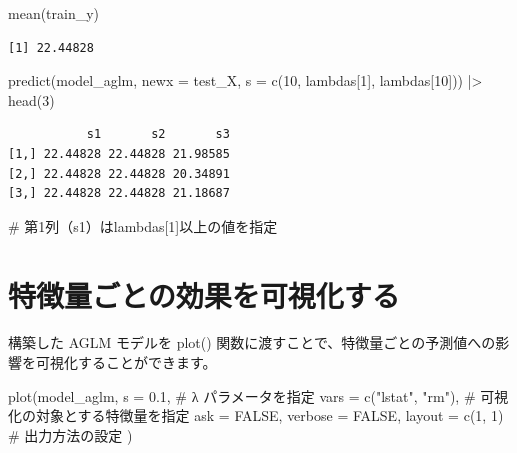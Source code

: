 \documentclass[
  letterpaper,
  DIV=11,
  numbers=noendperiod]{scrreprt}
\newenvironment{Shaded}{\begin{snugshade}}{\end{snugshade}}
\newcommand{\AttributeTok}[1]{\textcolor[rgb]{0.40,0.45,0.13}{#1}}
\newcommand{\CommentTok}[1]{\textcolor[rgb]{0.37,0.37,0.37}{#1}}
\newcommand{\ConstantTok}[1]{\textcolor[rgb]{0.56,0.35,0.01}{#1}}
\newcommand{\DecValTok}[1]{\textcolor[rgb]{0.68,0.00,0.00}{#1}}
\newcommand{\FloatTok}[1]{\textcolor[rgb]{0.68,0.00,0.00}{#1}}
\newcommand{\FunctionTok}[1]{\textcolor[rgb]{0.28,0.35,0.67}{#1}}
\newcommand{\NormalTok}[1]{\textcolor[rgb]{0.00,0.23,0.31}{#1}}
\newcommand{\SpecialCharTok}[1]{\textcolor[rgb]{0.37,0.37,0.37}{#1}}
\newcommand{\StringTok}[1]{\textcolor[rgb]{0.13,0.47,0.30}{#1}}
\begin{document}
\begin{Shaded}
\begin{Highlighting}[]
\FunctionTok{mean}\NormalTok{(train\_y)}
\end{Highlighting}
\end{Shaded}

\begin{verbatim}
[1] 22.44828
\end{verbatim}

\begin{Shaded}
\begin{Highlighting}[]
\FunctionTok{predict}\NormalTok{(model\_aglm, }\AttributeTok{newx =}\NormalTok{ test\_X,}
        \AttributeTok{s =} \FunctionTok{c}\NormalTok{(}\DecValTok{10}\NormalTok{, lambdas[}\DecValTok{1}\NormalTok{], lambdas[}\DecValTok{10}\NormalTok{])) }\SpecialCharTok{|\textgreater{}} \FunctionTok{head}\NormalTok{(}\DecValTok{3}\NormalTok{)}
\end{Highlighting}
\end{Shaded}

\begin{verbatim}
           s1       s2       s3
[1,] 22.44828 22.44828 21.98585
[2,] 22.44828 22.44828 20.34891
[3,] 22.44828 22.44828 21.18687
\end{verbatim}

\begin{Shaded}
\begin{Highlighting}[]
\CommentTok{\# 第1列（s1）はlambdas[1]以上の値を指定}
\end{Highlighting}
\end{Shaded}

\section{特徴量ごとの効果を可視化する}\label{ux7279ux5fb4ux91cfux3054ux3068ux306eux52b9ux679cux3092ux53efux8996ux5316ux3059ux308b}

構築した AGLM モデルを plot()
関数に渡すことで、特徴量ごとの予測値への影響を可視化することができます。

\begin{Shaded}
\begin{Highlighting}[]
\FunctionTok{plot}\NormalTok{(model\_aglm,}
     \AttributeTok{s =} \FloatTok{0.1}\NormalTok{, }\CommentTok{\# λ パラメータを指定}
     \AttributeTok{vars =} \FunctionTok{c}\NormalTok{(}\StringTok{"lstat"}\NormalTok{, }\StringTok{"rm"}\NormalTok{), }\CommentTok{\# 可視化の対象とする特徴量を指定}
     \AttributeTok{ask =} \ConstantTok{FALSE}\NormalTok{, }\AttributeTok{verbose =} \ConstantTok{FALSE}\NormalTok{, }\AttributeTok{layout =} \FunctionTok{c}\NormalTok{(}\DecValTok{1}\NormalTok{, }\DecValTok{1}\NormalTok{) }\CommentTok{\# 出力方法の設定}
\NormalTok{)}
\end{Highlighting}
\end{Shaded}
\end{document}
